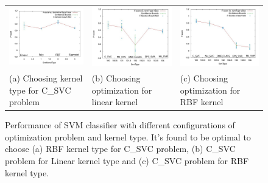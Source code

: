 \documentclass[runningheads]{llncs}
\begin{document}
\begin{figure}
  \centering
  \begin{tabular}{m{5cm}m{5cm}m{5cm}}
  \hspace{-1.5cm}
    \includegraphics[width=5cm]{img/classifier/SvmKernelTypevalue_vs_score_C_SVC.jpg} &
    \hspace{-1.5cm}
    \includegraphics[width=5cm]{img/classifier/SvmTypevalue_vs_score_LINEAR.jpg} &
    \hspace{-1.5cm}
    \includegraphics[width=5cm]{img/classifier/SvmTypevalue_vs_score_RBF.jpg} \\
    \hspace{-1.5cm}
    \tiny (a) Choosing kernel type for C\_SVC problem & 
    \hspace{-1.5cm}
    \tiny (b) Choosing optimization for linear kernel &
    \hspace{-1.5cm}
    \tiny (c) Choosing optimization for RBF kernel
  \end{tabular}
  
  \caption{Performance of SVM classifier with different configurations of optimization problem and kernel type. It's found to be optimal to choose (a) RBF kernel type for C\_SVC problem, (b) C\_SVC problem for Linear kernel type and (c) C\_SVC problem for RBF kernel type.}\label{fig:k-fold}
\end{figure}
\end{document}
